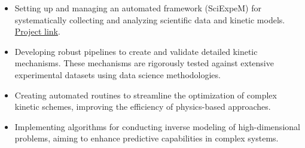 %
%
%

\begin{itemize}
   \item Setting up and managing an automated framework (SciExpeM) for systematically
      collecting and analyzing scientific data and kinetic
      models. \href{https://sciexpem.polimi.it}{Project link}.

   \item Developing robust pipelines to create and validate detailed kinetic mechanisms.
      These mechanisms are rigorously tested against extensive experimental datasets using
      data science methodologies.

   \item Creating automated routines to streamline the optimization of complex kinetic
      schemes, improving the efficiency of physics-based approaches.

   \item Implementing algorithms for conducting inverse modeling of high-dimensional
      problems, aiming to enhance predictive capabilities in complex systems.
\end{itemize}
